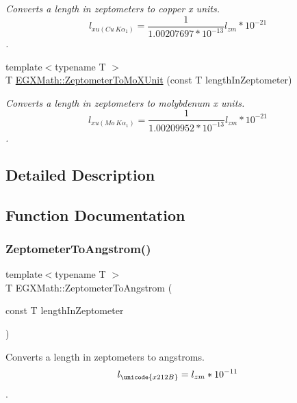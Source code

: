 \begin{DoxyCompactItemize}
\begin{DoxyCompactList}\small\item\em Converts a length in zeptometers to copper x units. \[ l_{xu(Cu\ K\alpha_1)}= \frac{1}{1.00207697*10^{-13}} l_{zm} * 10^{-21}\]. \end{DoxyCompactList}\item 
{\footnotesize template$<$typename T $>$ }\\T \mbox{\hyperlink{group___e_g_x_math-_conversions-_length_conversions-_zeptometer-_non-_s_i_gaa621a874847d7e6aae8d04395c68a313}{E\+G\+X\+Math\+::\+Zeptometer\+To\+Mo\+X\+Unit}} (const T length\+In\+Zeptometer)
\begin{DoxyCompactList}\small\item\em Converts a length in zeptometers to molybdenum x units. \[ l_{xu(Mo\ K\alpha_1)}=\frac{1}{1.00209952*10^{-13}} l_{zm} * 10^{-21}\]. \end{DoxyCompactList}\end{DoxyCompactItemize}


\subsection{Detailed Description}


\subsection{Function Documentation}
\mbox{\label{group___e_g_x_math-_conversions-_length_conversions-_zeptometer-_non-_s_i_gaa7023afd2a269dddf741cb4299803ef2}} 
\subsubsection{\texorpdfstring{Zeptometer\+To\+Angstrom()}{ZeptometerToAngstrom()}}
{\footnotesize\ttfamily template$<$typename T $>$ \\
T E\+G\+X\+Math\+::\+Zeptometer\+To\+Angstrom (\begin{DoxyParamCaption}\item[{const T}]{length\+In\+Zeptometer }\end{DoxyParamCaption})}



Converts a length in zeptometers to angstroms. \[ l_{\unicode{x212B}}=l_{zm} * 10^{-11} \]. 

